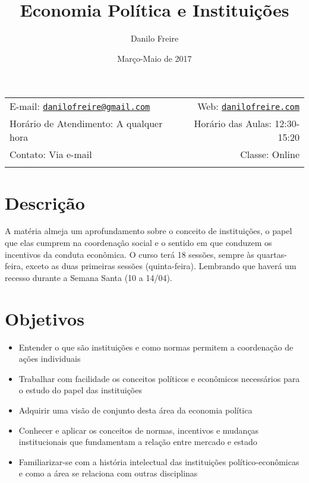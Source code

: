 \documentclass[12pt,]{article}
\title{Economia Política e Instituições}
\author{Danilo Freire}
\date{Março-Maio de 2017}
\providecommand{\tightlist}{%
  \setlength{\itemsep}{0pt}\setlength{\parskip}{0pt}}
\begin{document}
  

		\maketitle
		
	
		\thispagestyle{firststyle}



	\noindent \begin{tabular*}{\textwidth}{ @{\extracolsep{\fill}} lr @{\extracolsep{\fill}}}


E-mail: \texttt{\href{mailto:danilofreire@gmail.com}{\nolinkurl{danilofreire@gmail.com}}} & Web: \href{http://danilofreire.com}{\tt danilofreire.com}\\
Horário de Atendimento: A qualquer hora  &  Horário das Aulas: 12:30-15:20\\
Contato: Via e-mail  & Classe: Online\\
	&  \\
	\hline
	\end{tabular*}
	
\vspace{2mm}
	


\section{Descrição}\label{descricao}

A matéria almeja um aprofundamento sobre o conceito de instituições, o
papel que elas cumprem na coordenação social e o sentido em que conduzem
os incentivos da conduta econômica. O curso terá 18 sessões, sempre às
quartas-feira, exceto as duas primeiras sessões (quinta-feira).
Lembrando que haverá um recesso durante a Semana Santa (10 a 14/04).

\section{Objetivos}\label{objetivos}

\begin{itemize}
\tightlist
\item
  Entender o que são instituições e como normas permitem a coordenação
  de ações individuais
\item
  Trabalhar com facilidade os conceitos políticos e econômicos
  necessários para o estudo do papel das instituições
\item
  Adquirir uma visão de conjunto desta área da economia política
\item
  Conhecer e aplicar os conceitos de normas, incentivos e mudanças
  institucionais que fundamentam a relação entre mercado e estado
\item
  Familiarizar-se com a história intelectual das instituições
  político-econômicas e como a área se relaciona com outras disciplinas
\end{itemize}
\end{document}
